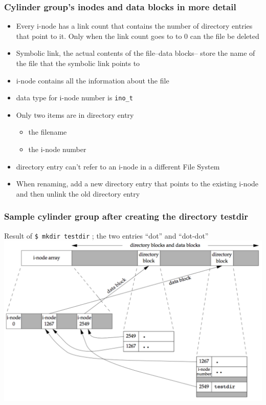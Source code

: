 \documentclass[newPxFont,sthlmFooter,nooffset]{beamer}
\begin{document}
\begin{frame}
  \frametitle{Cylinder group's inodes and data blocks in more detail}
  \begin{itemize}
  \item Every i-node has a link count that contains the number
    of directory entries that point to it. Only when the link count
    goes to to 0 can the file be deleted
  \item Symbolic link, the actual contents of the file--data blocks--
    store the name of the file that the symbolic link points to
  \item i-node contains all the information about the file
  \item data type for i-node number is \texttt{ino\_t}
  \item Only two items are in directory entry
    \begin{itemize}
    \item the filename
    \item the i-node number
    \end{itemize}
  \item directory entry can't refer to an i-node in a different File System
  \item When renaming, add a new directory entry that points to the existing i-node and then unlink the old directory entry 
  \end{itemize}

\end{frame}

\begin{frame}
  \frametitle{Sample cylinder group after creating the directory testdir}
Result of \texttt{\$ mkdir testdir} ; the two entries ``dot'' and ``dot-dot''
\includegraphics[width=\textwidth]{figure/fig4_15_sample.png}  
\end{frame}
\end{document}
